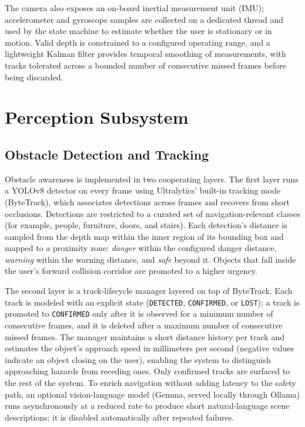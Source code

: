 The camera also exposes an on-board inertial measurement unit (IMU); accelerometer and gyroscope samples are collected on a dedicated thread and used by the state machine to estimate whether the user is stationary or in motion. Valid depth is constrained to a configured operating range, and a lightweight Kalman filter provides temporal smoothing of measurements, with tracks tolerated across a bounded number of consecutive missed frames before being discarded.

\section{Perception Subsystem}

\subsection{Obstacle Detection and Tracking}

Obstacle awareness is implemented in two cooperating layers. The first layer runs a YOLOv8 detector on every frame using Ultralytics' built-in tracking mode (ByteTrack), which associates detections across frames and recovers from short occlusions. Detections are restricted to a curated set of navigation-relevant classes (for example, people, furniture, doors, and stairs). Each detection's distance is sampled from the depth map within the inner region of its bounding box and mapped to a proximity zone: \emph{danger} within the configured danger distance, \emph{warning} within the warning distance, and \emph{safe} beyond it. Objects that fall inside the user's forward collision corridor are promoted to a higher urgency.

The second layer is a track-lifecycle manager layered on top of ByteTrack. Each track is modeled with an explicit state (\texttt{DETECTED}, \texttt{CONFIRMED}, or \texttt{LOST}); a track is promoted to \texttt{CONFIRMED} only after it is observed for a minimum number of consecutive frames, and it is deleted after a maximum number of consecutive missed frames. The manager maintains a short distance history per track and estimates the object's approach speed in millimeters per second (negative values indicate an object closing on the user), enabling the system to distinguish approaching hazards from receding ones. Only confirmed tracks are surfaced to the rest of the system. To enrich navigation without adding latency to the safety path, an optional vision-language model (Gemma, served locally through Ollama) runs asynchronously at a reduced rate to produce short natural-language scene descriptions; it is disabled automatically after repeated failures.

